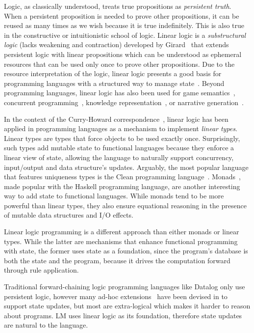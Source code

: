 Logic, as classically understood, treats true propositions as \emph{persistent
truth}. When a persistent proposition is needed to prove other propositions, it
can be reused as many times as we wish because it is true indefinitely. This is
also true in the constructive or intuitionistic school of logic.  Linear logic
is a \emph{substructural logic} (lacks weakening and contraction) developed by
Girard~\cite{Girard95logic:its} that extends persistent logic with linear
propositions which can be understood as ephemeral resources that can be used
only once to prove other propositions.  Due to the resource interpretation of
the logic, linear logic presents a good basis for programming languages with a
structured way to manage state~\cite{Miller85anoverview}. Beyond programming
languages, linear logic has also been used for game
semantics~\cite{lafont1991games,blass1992game}, concurrent
programming~\cite{lopez2005monadic,mazurak2010lolliproc,perez-2012}, knowledge
representation~\cite{bos2011survey}, or narrative
generation~\cite{chris-int7,martens2013linear}.

In the context of the Curry-Howard correspondence~\cite{howard:tfatnoc}, linear
logic has been applied in programming languages as a mechanism to implement
\emph{linear types}. Linear types are types that force objects to be used
exactly once. Surprisingly, such types add mutable state to functional languages
because they enforce a linear view of state, allowing the language to naturally
support concurrency, input/output and data structure's updates.  Arguably, the
most popular language that features uniqueness types is the Clean programming
language~\cite{JFP:1349748}.  Monads~\cite{Wadler:1997:DI:262009.262011}, made
popular with the Haskell programming language, are another interesting way to
add state to functional languages. While monads tend to be more powerful than
linear types, they also ensure equational reasoning in the presence of mutable
data structures and I/O effects.

Linear logic programming is a different approach than either monads or linear
types.  While the latter are mechanisms that enhance functional programming with
state, the former uses state as a foundation, since the program's database is
both the state and the program, because it drives the computation forward
through rule application.

Traditional forward-chaining logic programming languages like
Datalog only use persistent logic, however many ad-hoc
extensions~\cite{Liu98extendingdatalog,Ludascher95alogical} have been devised
in to support state updates, but most are extra-logical which makes it harder
to reason about programs. LM uses linear logic as its foundation, therefore
state updates are natural to the language.

